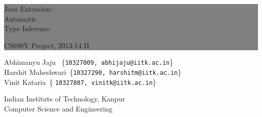 \thispagestyle{empty} %


\colorbox{grey}{
	\parbox[t]{1.0\linewidth}{
		\begin{center}
		\fontsize{50pt}{80pt}\selectfont %
		\vspace*{0.7cm} %
		
		\hfill Java Extension:\\
		\hfill Automatic \\
		\hfill Type Inference\\
		\vspace{0.5cm}
		\end{center}				
		\raggedleft
		\fontsize{25pt}{12pt}\selectfont
		CS698Y Project, 2013-14 II
		\vspace*{0.7cm} %
		
	}
}


\vfill %


{\centering \large 
\hfill Abhimanyu Jaju \   \{\texttt{10327009, abhijaju@iitk.ac.in}\}\\
\hfill Harshit Maheshwari\ \{\texttt{10327290, harshitm@iitk.ac.in}\}\\
\hfill Vinit Kataria\ \{ \texttt{10327807, vinitk@iitk.ac.in}\}\\
\vspace{0.5cm}

\hfill Indian Institute of Technology, Kanpur \\
\hfill Computer Science and Engineering\\



\HRule{1pt}} %


\clearpage %
